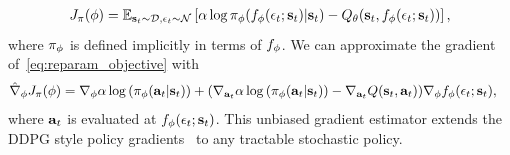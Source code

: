\begin{align}
J_\pi({\phi}) = \operatorname{\mathbb{E}}_{{\mathbf{s}_t}\sim\mathcal{D},\epsilon_t\sim\mathcal{N}}\left[\alpha \log \pi_{\phi}(f_{\phi}(\epsilon_t;{\mathbf{s}_t})|{\mathbf{s}_t}) - Q_\theta({\mathbf{s}_t}, f_{\phi}(\epsilon_t;{\mathbf{s}_t}))\right],
\label{eq:reparam_objective}
\end{align}
where $\pi_{\phi}$ is defined implicitly in terms of $f_{\phi}$. We can approximate the gradient of~\autoref{eq:reparam_objective} with
\begin{align}
&\hat\nabla_{\phi} J_\pi({\phi}) = \nabla_{\phi} \alpha \log\left( \pi_{\phi}({\mathbf{a}_t}|{\mathbf{s}_t})\right) + (\nabla_{\mathbf{a}_t} \alpha \log \left(\pi_{\phi}({\mathbf{a}_t}|{\mathbf{s}_t})\right)
- \nabla_{\mathbf{a}_t} Q({\mathbf{s}_t}, {\mathbf{a}_t}))\nabla_{\phi} f_{\phi}(\epsilon_t;{\mathbf{s}_t}),
\label{eq:policy_gradient}
\end{align}
where ${\mathbf{a}_t}$ is evaluated at $f_{\phi}(\epsilon_t; {\mathbf{s}_t})$. This unbiased gradient estimator extends the DDPG style policy gradients~\citep{lillicrap2015continuous} to any tractable stochastic policy.






